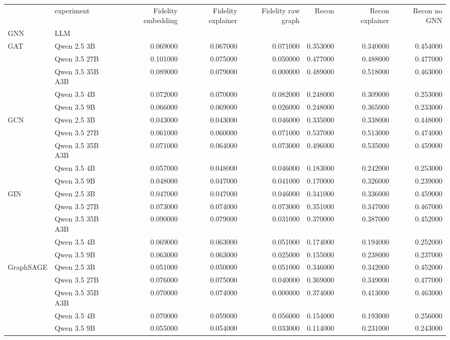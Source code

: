 \begin{tabular}{llrrrrrr}
\toprule
 & experiment & Fidelity embedding & Fidelity explainer & Fidelity raw graph & Recon & Recon explainer & Recon no GNN \\
GNN & LLM &  &  &  &  &  &  \\
\midrule
\multirow[t]{5}{*}{GAT} & Qwen 2.5 3B & 0.069000 & 0.067000 & 0.071000 & 0.353000 & 0.340000 & 0.454000 \\
 & Qwen 3.5 27B & 0.101000 & 0.075000 & 0.050000 & 0.477000 & 0.488000 & 0.477000 \\
 & Qwen 3.5 35B A3B & 0.089000 & 0.079000 & 0.000000 & 0.489000 & 0.518000 & 0.463000 \\
 & Qwen 3.5 4B & 0.072000 & 0.070000 & 0.082000 & 0.248000 & 0.309000 & 0.253000 \\
 & Qwen 3.5 9B & 0.066000 & 0.069000 & 0.026000 & 0.248000 & 0.365000 & 0.233000 \\
\cline{1-8}
\multirow[t]{5}{*}{GCN} & Qwen 2.5 3B & 0.043000 & 0.043000 & 0.046000 & 0.335000 & 0.338000 & 0.448000 \\
 & Qwen 3.5 27B & 0.061000 & 0.060000 & 0.071000 & 0.537000 & 0.513000 & 0.474000 \\
 & Qwen 3.5 35B A3B & 0.071000 & 0.064000 & 0.073000 & 0.496000 & 0.535000 & 0.459000 \\
 & Qwen 3.5 4B & 0.057000 & 0.048000 & 0.046000 & 0.183000 & 0.242000 & 0.253000 \\
 & Qwen 3.5 9B & 0.048000 & 0.047000 & 0.041000 & 0.170000 & 0.326000 & 0.239000 \\
\cline{1-8}
\multirow[t]{5}{*}{GIN} & Qwen 2.5 3B & 0.047000 & 0.047000 & 0.046000 & 0.341000 & 0.336000 & 0.459000 \\
 & Qwen 3.5 27B & 0.073000 & 0.074000 & 0.073000 & 0.351000 & 0.347000 & 0.467000 \\
 & Qwen 3.5 35B A3B & 0.090000 & 0.079000 & 0.031000 & 0.370000 & 0.387000 & 0.452000 \\
 & Qwen 3.5 4B & 0.069000 & 0.063000 & 0.051000 & 0.174000 & 0.194000 & 0.252000 \\
 & Qwen 3.5 9B & 0.063000 & 0.063000 & 0.025000 & 0.155000 & 0.238000 & 0.237000 \\
\cline{1-8}
\multirow[t]{5}{*}{GraphSAGE} & Qwen 2.5 3B & 0.051000 & 0.050000 & 0.051000 & 0.346000 & 0.342000 & 0.452000 \\
 & Qwen 3.5 27B & 0.076000 & 0.075000 & 0.040000 & 0.369000 & 0.349000 & 0.477000 \\
 & Qwen 3.5 35B A3B & 0.070000 & 0.074000 & 0.000000 & 0.374000 & 0.413000 & 0.463000 \\
 & Qwen 3.5 4B & 0.070000 & 0.059000 & 0.056000 & 0.154000 & 0.193000 & 0.256000 \\
 & Qwen 3.5 9B & 0.055000 & 0.054000 & 0.033000 & 0.114000 & 0.231000 & 0.243000 \\
\cline{1-8}
\bottomrule
\end{tabular}
